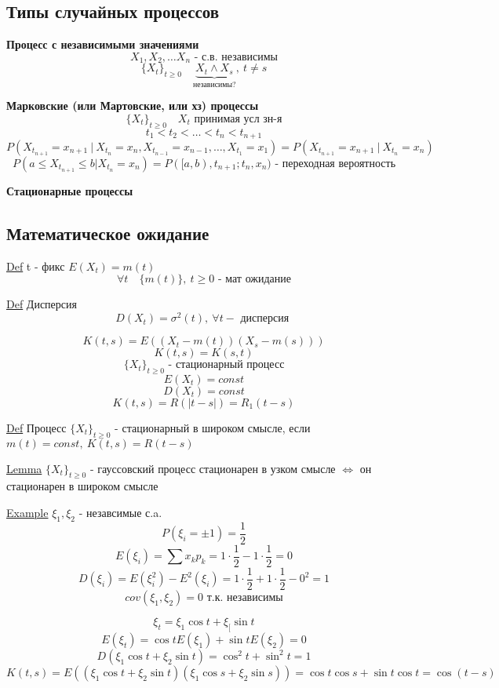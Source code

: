 \documentclass[a4paper]{article}
\begin{document}
\subsection*{\centering Типы случайных процессов}

\textbf{Процесс с независимыми значениями}
\[
    X_1, X_2, \dots X_n \text{ - с.в. независимы}
\]
\[
    \{ X_t \}_{t \geq 0} \quad \underbrace{X_t \land X_s}_{\text{независимы?}}, \ t \neq s
\]

\textbf{Марковские (или Мартовские, или хз) процессы}
\[
    \{ X_t \}_{t \geq 0} \quad X_t \text{ принимая усл зн-я}
\]
\[
    t_1 < t_2 < \dots < t_n < t_{n+1}
\]
\[
    P(X_{t_{n+1}} = x_{n+1} \ | \ X_{t_n} = x_n, X_{t_{n-1}}= x_{n-1}, \dots,
    X_{t_1} = x_1) = P(X_{t_{n+1}} = x_{n+1} \ | \ X_{t_n}= x_n)
\]
\[
    P(a \leq X_{t_{n+1}} \leq b | X_{t_n} = x_n) = P([a,b), t_{n+1}; t_n, x_n)
    \text{ - переходная вероятность}
\]

\textbf{Стационарные процессы}

\subsection*{Математическое ожидание}

\begin{tcolorbox}
    \underline{Def} t - фикс $ E(X_t) = m(t) $ 
    \[
        \forall t \quad \{ m(t) \}, \ t \geq 0 \text{ - мат ожидание}
    \]

    \underline{Def} Дисперсия
    \[
        D(X_t) = \sigma^2(t), \ \forall t - \text{ дисперсия }
    \]
\end{tcolorbox}
\[
    K(t,s) = E((X_t - m(t))(X_s - m(s)))
\]
\[
    K(t,s) = K(s,t)
\]
\[
    \{ X_t\}_{t \geq 0} \text{ - стационарный процесс}
\]
\[
    E(X_t) = const 
\]
\[
    D(X_t) = const
\]
\[
    K(t,s) = R(|t-s|) = R_1(t-s)
\]

\begin{tcolorbox}
    \underline{Def} Процесс $ \{X_t\}_{t \geq 0} $ - стационарный в широком смысле,
    если $ m(t) = const, \ K(t,s) = R(t-s) $ 
\end{tcolorbox}

\begin{tcolorbox}
    \underline{Lemma} $ \{ X_t \}_{t \geq 0} $ - гауссовский процесс стационарен
    в узком смысле $ \iff $ он стационарен в широком смысле
\end{tcolorbox}

\begin{tcolorbox}
\underline{Example} $ \xi_1, \xi_2 $ - незавсимые с.a.
\[
    P(\xi_i = \pm 1) = \frac{1}{2} 
\]
\[
    E(\xi_i) = \sum x_k p_k = 1 \cdot \frac{1}{2} - 1 \cdot \frac{1}{2}  = 0
\]
\[
    D(\xi_i) = E(\xi_i^2) - E^2(\xi_i) = 1 \cdot \frac{1}{2} + 1 \cdot \frac{1}{2} 
    - 0^2 = 1
\]
\[
    cov(\xi_1, \xi_2) = 0 \text{ т.к. независимы}
\]

\[
    \xi_t = \xi_1 \cos t + \xi_[ \sin t
\]
\[
    E(\xi_t) = \cos t E(\xi_1) + \sin t E(\xi_2) = 0
\]
\[
    D(\xi_1 \cos t + \xi_2 \sin t) = \cos^2 t + \sin^2 t = 1
\]
\[
    K(t,s) = E((\xi_1 \cos t + \xi_2 \sin t) (\xi_1 \cos s + \xi_2 \sin s)) = 
    \cos t \cos s + \sin t \cos t = \cos (t-s)
\]
\end{tcolorbox}
\end{document}
